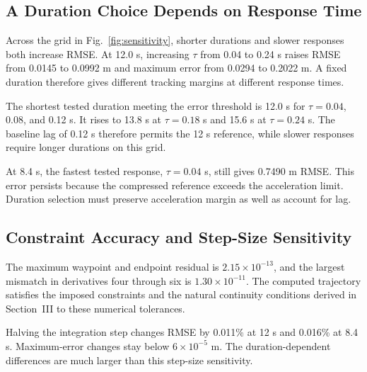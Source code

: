 \documentclass[letterpaper,10pt,conference]{ieeeconf}
\begin{document}
\subsection{A Duration Choice Depends on Response Time}
Across the grid in Fig.~\ref{fig:sensitivity}, shorter durations and slower responses both increase RMSE.
At 12.0 s, increasing $\tau$ from 0.04 to 0.24 s raises RMSE from 0.0145 to 0.0992 m and maximum error from 0.0294 to 0.2022 m.
A fixed duration therefore gives different tracking margins at different response times.

The shortest tested duration meeting the error threshold is 12.0 s for $\tau=0.04$, 0.08, and 0.12 s.
It rises to 13.8 s at $\tau=0.18$ s and 15.6 s at $\tau=0.24$ s.
The baseline lag of 0.12 s therefore permits the 12 s reference, while slower responses require longer durations on this grid.

At 8.4 s, the fastest tested response, $\tau=0.04$ s, still gives 0.7490 m RMSE.
This error persists because the compressed reference exceeds the acceleration limit.
Duration selection must preserve acceleration margin as well as account for lag.
\subsection{Constraint Accuracy and Step-Size Sensitivity}
The maximum waypoint and endpoint residual is $2.15\times10^{-13}$, and the largest mismatch in derivatives four through six is $1.30\times10^{-11}$.
The computed trajectory satisfies the imposed constraints and the natural continuity conditions derived in Section~III to these numerical tolerances.

Halving the integration step changes RMSE by 0.011\% at 12 s and 0.016\% at 8.4 s.
Maximum-error changes stay below $6\times10^{-5}$ m.
The duration-dependent differences are much larger than this step-size sensitivity.
\end{document}
